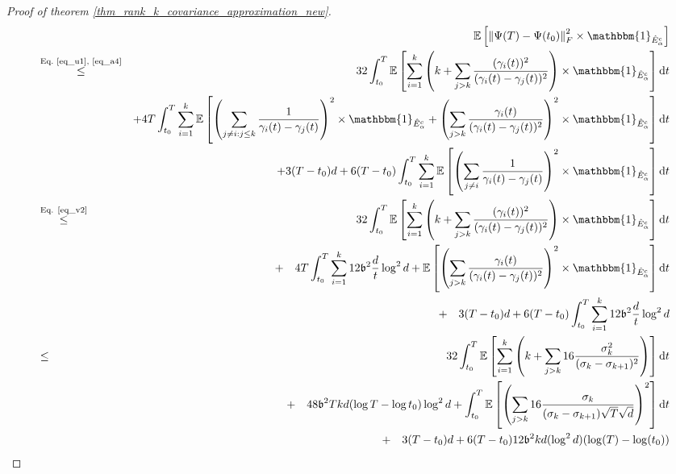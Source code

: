 \documentclass[11pt,letterpaper]{article}
\begin{document}
\begin{proof}[Proof of theorem \ref{thm_rank_k_covariance_approximation_new}]
 \begin{eqnarray}
& & \! \! \!\!\!\!\!\!\!\!\!\!\!\!\!\!\!\! \! \!\! \! \!\!\!\!\!\!\!\!\!\!\!\!\!\!\!\! \mathbb{E}\left[\left\|\Psi (T) -  \Psi(t_0)\right \|_F^2 \times   \mathbbm{1}_{\hat{E}_\alpha^c}\right]\nonumber\\ 
    &\stackrel{\textrm{Eq.\ \eqref{eq_u1}, \eqref{eq_a4}}}{\leq}& 32\int_{t_0}^{T}   \mathbb{E}\left[ \sum_{i=1}^{k} \left( k +  \sum_{j >k}  \frac{(\gamma_i(t))^2}{(\gamma_i(t) - \gamma_j(t))^2} \right)  \times \mathbbm{1}_{\hat{E}_\alpha^c}\right]\mathrm{d}t \nonumber \\
    & &  +    4T \int_{t_0}^{T}\sum_{i=1}^{k}\mathbb{E}\left[\left(\sum_{j \neq i: j\leq k} \frac{1}{\gamma_i(t) - \gamma_j(t)}\right)^2 \times \mathbbm{1}_{\hat{E}_\alpha^c} +  \left(\sum_{j> k} \frac{\gamma_i(t)}{(\gamma_i(t) - \gamma_j(t))^2}\right)^2  \times \mathbbm{1}_{\hat{E}_\alpha^c}\right] \mathrm{d}t\nonumber\\
    & & +  3(T-t_0) d +  6 (T-t_0)\int_{t_0}^T \sum_{i=1}^k\mathbb{E}\left[  \left(\sum_{j \neq i} \frac{1}{\gamma_i(t) - \gamma_j(t)}\right)^2 \times \mathbbm{1}_{\hat{E}_\alpha^c} \right] \mathrm{d}t \nonumber\\
    &\stackrel{\textrm{Eq. \eqref{eq_v2}}}{\leq}& 
    32\int_{t_0}^{T}   \mathbb{E}\left[ \sum_{i=1}^{k} \left( k +  \sum_{j >k}  \frac{(\gamma_i(t))^2}{(\gamma_i(t) - \gamma_j(t))^2} \right)  \times \mathbbm{1}_{\hat{E}_\alpha^c}\right]\mathrm{d}t \nonumber \\
    & & +  \quad    4T \int_{t_0}^{T}\sum_{i=1}^{k}12 \mathfrak{b}^2 \frac{d}{t} \log^2 d  +  \mathbb{E}\left[\left(\sum_{j> k} \frac{\gamma_i(t)}{(\gamma_i(t) - \gamma_j(t))^2}\right)^2  \times \mathbbm{1}_{\hat{E}_\alpha^c}\right] \mathrm{d}t\nonumber\\
    & & + \quad 3(T-t_0) d +  6 (T-t_0)\int_{t_0}^T \sum_{i=1}^k 12 \mathfrak{b}^2  \frac{d}{t} \log^2 d  \nonumber\\
    &\leq &     32\int_{t_0}^{T}   \mathbb{E}\left[ \sum_{i=1}^{k} \left( k +  \sum_{j >k}  16 \frac{\sigma_k^2}{(\sigma_k-\sigma_{k+1})^2} \right)  \right]\mathrm{d}t \label{eq_n129} \\
    & & + \quad     48 \mathfrak{b}^2 T kd (\log T- \log t_0) \log^2 d  +  \int_{t_0}^{T}  \mathbb{E}\left[\left(\sum_{j> k} 16 \frac{\sigma_k}{(\sigma_k-\sigma_{k+1}) \sqrt{T} \sqrt{d}}\right)^2 \right] \mathrm{d}t\nonumber\\
    & & + \quad  3(T-t_0) d +  6 (T-t_0) 12 \mathfrak{b}^2  kd (\log^2 d) (\log(T)-\log(t_0)) \nonumber\\

\end{eqnarray}
\end{proof}
\end{document}
